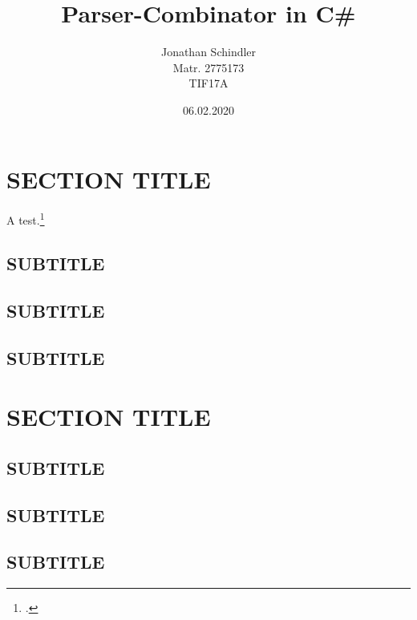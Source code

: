 \documentclass[12pt]{article}
\title{Parser-Combinator in C\#}
\author{Jonathan Schindler \\ Matr. 2775173 \\ TIF17A}
\date{06.02.2020}
\begin{document}
	
	\newpage
	\tableofcontents
	\newpage
	
	\section{SECTION TITLE}
	
	
	A test.\footcite{krause}
	
	\subsection{SUBTITLE}
	
	
	\subsection{SUBTITLE} 
	
	
	\subsection{SUBTITLE}
	
	
	\newpage
	
	\section{SECTION TITLE}
	
	
	\subsection{SUBTITLE}
	
	
	\subsection{SUBTITLE}
	
	
	\subsection{SUBTITLE}
	
\end{document}
